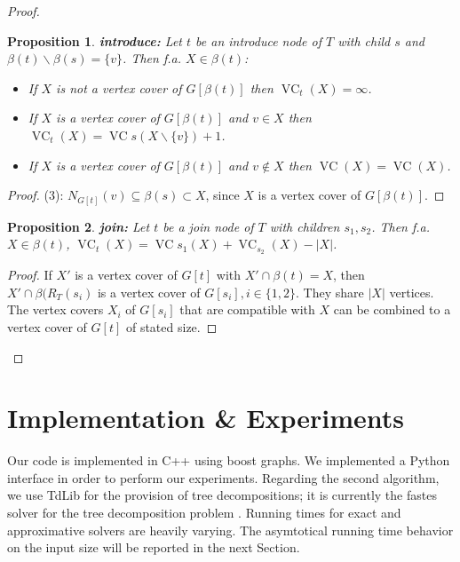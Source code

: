 \documentclass[11pt,a4paper]{article}
\newtheorem*{proposition}{Proposition}
\DeclareMathOperator{\VC}{VC}
\begin{document}
\begin{proof}
\begin{proposition}
\textbf{introduce:} Let $t$ be an introduce node of $T$ with child $s$ and $\beta(t) \backslash \beta(s) = \{v\}$. Then f.a. $X \in \beta(t)$:

\begin{itemize}
\item [(1)] If $X$ is not a vertex cover of $G[\beta(t)]$ then $\VC_{t}(X) = \infty$. 
\item [(2)] If $X$ is a vertex cover of $G[\beta(t)]$ and $v \in X$ then $\VC_{t}(X) = \VC{s}(X \backslash \{v\}) + 1$.
\item [(3)] If $X$ is a vertex cover of $G[\beta(t)]$ and $v \not \in X$ then $\VC(X) = \VC(X)$.
\end{itemize}
\end{proposition}

\begin{proof}
(3): $N_{G[t]}(v) \subseteq \beta(s) \subset X$, since $X$ is a vertex cover of $G[\beta(t)]$.
\end{proof}


\begin{proposition}
\textbf{join:} Let $t$ be a join node of $T$ with children $s_{1}, s_{2}$. Then f.a. $X \in \beta(t)$, $\VC_{t}(X) = \VC{s_{1}}(X) + \VC_{s_{2}}(X) - |X|$.
\end{proposition}

\begin{proof}
If $X'$ is a vertex cover of $G[t]$ with $X' \cap \beta(t) = X$, then $X' \cap \beta(R_{T}(s_{i})$ is a vertex cover of $G[s_{i}], i \in \{1,2\}$. They share $|X|$ vertices. The vertex covers $X_{i}$ of $G[s_{i}]$ that are compatible with $X$ can be combined to a vertex cover of $G[t]$ of stated size.
\end{proof}

\vspace*{-7.8mm}

\end{proof}

\section{Implementation \& Experiments}

Our code is implemented in C++ using boost graphs. We implemented a Python interface in order to perform our experiments. Regarding the second algorithm, we use TdLib for the provision of tree decompositions; it is currently the fastes solver for the tree decomposition problem \cite{TdLib} \cite{PACE_2017}. Running times for exact and approximative solvers are heavily varying. The asymtotical running time behavior on the input size will be reported in the next Section. \\
\end{document}
